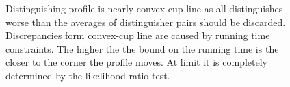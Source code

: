 \documentclass{crypto-exercise}
\begin{document}
\begin{solution}
\begin{figure}[H]
\begin{center}
\end{center}
\caption{Distinguishing profile is nearly convex-cup line as all distinguishes worse than the averages of distinguisher pairs should be discarded. Discrepancies form convex-cup line are caused by running time constraints. The higher the the bound on the running time is the closer to the corner the profile moves. At limit it is completely determined by the likelihood ratio test.}
\label{fig:distinguishing-profile}
\end{figure}

\end{solution}
\end{document}
